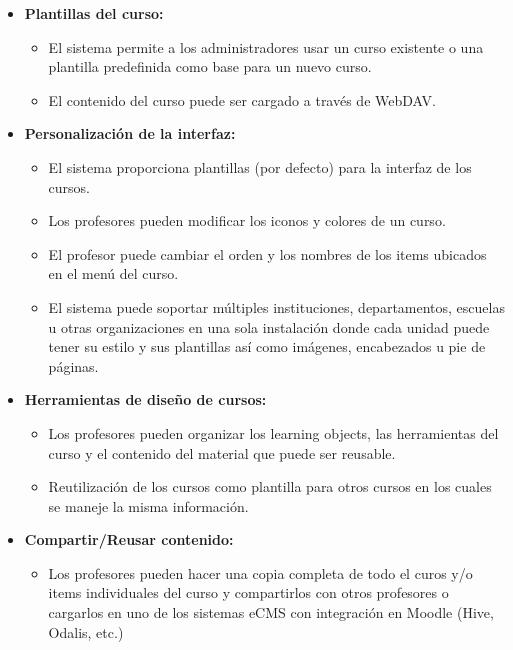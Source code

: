 	\begin{itemize}
		\item \textbf{Plantillas del curso:}
			\begin{itemize}
				\item El sistema permite a los administradores usar un curso existente o una plantilla predefinida como base para un nuevo curso.
				\item El contenido del curso puede ser cargado a través de WebDAV.
			\end{itemize}
	\end{itemize}
	\begin{itemize}
		\item \textbf{Personalización de la interfaz:}
			\begin{itemize}
				\item El sistema proporciona plantillas (por defecto) para la interfaz de los cursos.
				\item Los profesores pueden modificar los iconos y colores de un curso.
				\item El profesor puede cambiar el orden y los nombres de los items ubicados en el menú del curso.
				\item El sistema puede soportar múltiples instituciones, departamentos, escuelas u otras organizaciones en una sola instalación donde cada unidad puede tener su estilo y sus plantillas así como imágenes, encabezados u pie de páginas.
			\end{itemize}
	\end{itemize}
	\begin{itemize}
		\item \textbf{Herramientas de diseño de cursos:}
			\begin{itemize}
				\item Los profesores pueden organizar los learning objects, las herramientas del curso y el contenido del material que puede ser reusable.
				\item Reutilización de los cursos como plantilla para otros cursos en los cuales se maneje la misma información.
			\end{itemize}
	\end{itemize}
	\begin{itemize}
		\item \textbf{Compartir/Reusar contenido:}
			\begin{itemize}
				\item Los profesores pueden hacer una copia completa de todo el curos y/o items individuales del curso y compartirlos con otros profesores o cargarlos en uno de los sistemas eCMS con integración en Moodle (Hive, Odalis, etc.)
			\end{itemize}
	\end{itemize}
